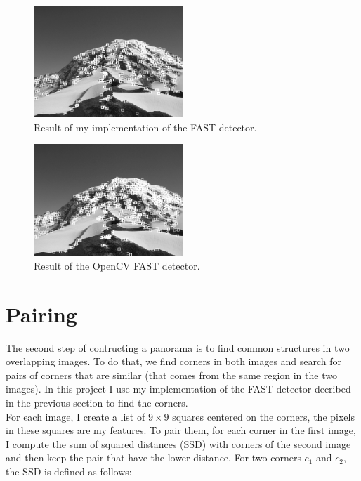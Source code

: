\documentclass[a4paper,twocolumn]{article}
\begin{document}
\begin{figure}[h]
	\centering\includegraphics[width=0.5\textwidth]{images/my_fast.png}
	\caption{Result of my implementation of the FAST detector.}
	\label{my_fast}
\end{figure}

\begin{figure}[h]
	\centering\includegraphics[width=0.5\textwidth]{images/opencv_fast.png}
	\caption{Result of the OpenCV FAST detector.}
	\label{opencv_fast}
\end{figure}

\section{Pairing}

The second step of contructing a panorama is to find common structures in two overlapping images. To do that, we find corners in both images and search for pairs of corners that are similar (that comes from the same region in the two images). In this project I use my implementation of the FAST detector decribed in the previous section to find the corners.
\\

For each image, I create a list of $9 \times 9$ squares centered on the corners, the pixels in these squares are my features. To pair them, for each corner in the first image, I compute the sum of squared distances (SSD) with corners of the second image and then keep the pair that have the lower distance. For two corners $c_1$ and $c_2$, the SSD is defined as follows:
\end{document}
